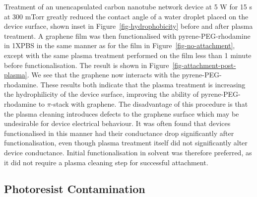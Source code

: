 \documentclass[
  a4paper,
]{scrbook}
\begin{document}
Treatment of an unencapsulated carbon nanotube network device at 5 W for
15 s at 300 mTorr greatly reduced the contact angle of a water droplet
placed on the device surface, shown inset in
Figure~\ref{fig-hydrophobicity} before and after plasma treatment. A
graphene film was then functionalised with pyrene-PEG-rhodamine in 1XPBS
in the same manner as for the film in Figure~\ref{fig-no-attachment},
except with the same plasma treatment performed on the film less than 1
minute before functionalisation. The result is shown in
Figure~\ref{fig-attachment-post-plasma}. We see that the graphene now
interacts with the pyrene-PEG-rhodamine. These results both indicate
that the plasma treatment is increasing the hydrophilicity of the device
surface, improving the ability of pyrene-PEG-rhodamine to \(\pi\)-stack
with graphene. The disadvantage of this procedure is that the plasma
cleaning introduces defects to the graphene surface which may be
undesirable for device electrical behaviour. It was often found that
devices functionalised in this manner had their conductance drop
significantly after functionalisation, even though plasma treatment
itself did not significantly alter device conductance. Initial
functionalisation in solvent was therefore preferred, as it did not
require a plasma cleaning step for successful attachment.

\hypertarget{sec-photoresist-contamination}{%
\subsection{Photoresist
Contamination}\label{sec-photoresist-contamination}}
\end{document}
